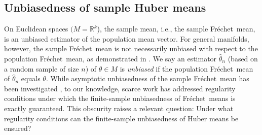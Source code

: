 \documentclass[preprint]{imsart}
\newcommand{\bbR}{\mathbb{R}}
\def\Frechet{Fr\'{e}chet}
\theoremstyle{plain}
\newtheorem{corollary}{Corollary}
\theoremstyle{remark}
\begin{document}





\subsection{Unbiasedness of sample Huber means}\label{sec:unbiased}
 
 
On Euclidean spaces $(M = \bbR^k$), the sample mean, i.e., the sample \Frechet\ mean, is an unbiased estimator of the population mean vector. For general manifolds, however, the sample \Frechet\ mean is not necessarily unbiased with respect to the population \Frechet\ mean, as demonstrated in  \cite{pennec2019curvature}. We say an estimator $\hat\theta_n$ (based on a random sample of size $n$) of $\theta \in M$ is \emph{unbiased} if the population \Frechet\ mean of $\hat\theta_n$ equals $\theta$. While  asymptotic unbiasedness of the sample \Frechet\ mean has been investigated \citep{schotz2019convergence,pennec2019curvature}, 
to our knowledge, scarce work has addressed regularity conditions under which the finite-sample unbiasedness of \Frechet\ means is exactly guaranteed. This obscurity raises a relevant question: Under what regularity conditions can the finite-sample unbiasedness of Huber means be ensured? 
 
\end{document}
